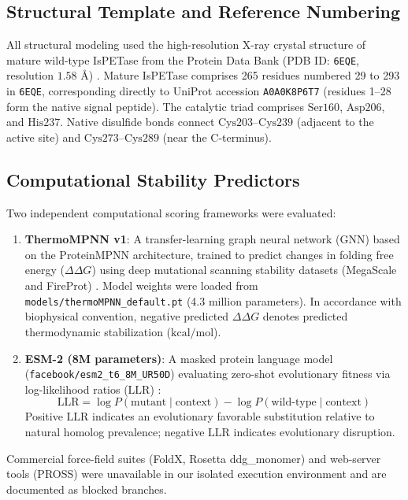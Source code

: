 \documentclass[11pt,a4paper]{article}
\begin{document}
\subsection{Structural Template and Reference Numbering}
All structural modeling used the high-resolution X-ray crystal structure of mature wild-type IsPETase from the Protein Data Bank (PDB ID: \texttt{6EQE}, resolution $1.58\text{ \AA}$) \cite{austin2018characterization}. Mature IsPETase comprises 265 residues numbered 29 to 293 in \texttt{6EQE}, corresponding directly to UniProt accession \texttt{A0A0K8P6T7} (residues 1--28 form the native signal peptide). The catalytic triad comprises $\text{Ser160}$, $\text{Asp206}$, and $\text{His237}$. Native disulfide bonds connect $\text{Cys203}\text{--}\text{Cys239}$ (adjacent to the active site) and $\text{Cys273}\text{--}\text{Cys289}$ (near the C-terminus).

\subsection{Computational Stability Predictors}
Two independent computational scoring frameworks were evaluated:
\begin{enumerate}
    \item \textbf{ThermoMPNN v1}: A transfer-learning graph neural network (GNN) based on the ProteinMPNN architecture, trained to predict changes in folding free energy ($\Delta\Delta G$) using deep mutational scanning stability datasets (MegaScale and FireProt) \cite{dieckhaus2024transfer}. Model weights were loaded from \texttt{models/thermoMPNN\_default.pt} (4.3 million parameters). In accordance with biophysical convention, negative predicted $\Delta\Delta G$ denotes predicted thermodynamic stabilization ($\text{kcal/mol}$).
    \item \textbf{ESM-2 (8M parameters)}: A masked protein language model (\texttt{facebook/esm2\_t6\_8M\_UR50D}) evaluating zero-shot evolutionary fitness via log-likelihood ratios ($\text{LLR}$) \cite{lin2023evolutionary}:
    \begin{equation}
        \text{LLR} = \log P(\text{mutant} \mid \text{context}) - \log P(\text{wild-type} \mid \text{context})
    \end{equation}
    Positive $\text{LLR}$ indicates an evolutionary favorable substitution relative to natural homolog prevalence; negative $\text{LLR}$ indicates evolutionary disruption.
\end{enumerate}
Commercial force-field suites (FoldX, Rosetta ddg\_monomer) and web-server tools (PROSS) were unavailable in our isolated execution environment and are documented as blocked branches.
\end{document}

